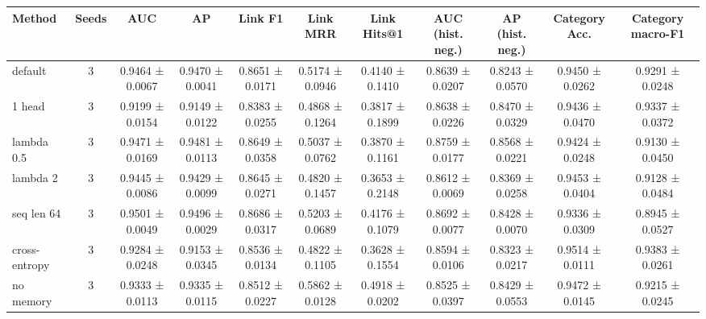 \begin{tabular}{lcccccccccc}
\toprule
Method & Seeds & AUC & AP & Link F1 & Link MRR & Link Hits@1 & AUC (hist. neg.) & AP (hist. neg.) & Category Acc. & Category macro-F1 \\
\midrule
default & 3 & 0.9464 ± 0.0067 & 0.9470 ± 0.0041 & 0.8651 ± 0.0171 & 0.5174 ± 0.0946 & 0.4140 ± 0.1410 & 0.8639 ± 0.0207 & 0.8243 ± 0.0570 & 0.9450 ± 0.0262 & 0.9291 ± 0.0248 \\
1 head & 3 & 0.9199 ± 0.0154 & 0.9149 ± 0.0122 & 0.8383 ± 0.0255 & 0.4868 ± 0.1264 & 0.3817 ± 0.1899 & 0.8638 ± 0.0226 & 0.8470 ± 0.0329 & 0.9436 ± 0.0470 & 0.9337 ± 0.0372 \\
lambda 0.5 & 3 & 0.9471 ± 0.0169 & 0.9481 ± 0.0113 & 0.8649 ± 0.0358 & 0.5037 ± 0.0762 & 0.3870 ± 0.1161 & 0.8759 ± 0.0177 & 0.8568 ± 0.0221 & 0.9424 ± 0.0248 & 0.9130 ± 0.0450 \\
lambda 2 & 3 & 0.9445 ± 0.0086 & 0.9429 ± 0.0099 & 0.8645 ± 0.0271 & 0.4820 ± 0.1457 & 0.3653 ± 0.2148 & 0.8612 ± 0.0069 & 0.8369 ± 0.0258 & 0.9453 ± 0.0404 & 0.9128 ± 0.0484 \\
seq len 64 & 3 & 0.9501 ± 0.0049 & 0.9496 ± 0.0029 & 0.8686 ± 0.0317 & 0.5203 ± 0.0689 & 0.4176 ± 0.1079 & 0.8692 ± 0.0077 & 0.8428 ± 0.0070 & 0.9336 ± 0.0309 & 0.8945 ± 0.0527 \\
cross-entropy & 3 & 0.9284 ± 0.0248 & 0.9153 ± 0.0345 & 0.8536 ± 0.0134 & 0.4822 ± 0.1105 & 0.3628 ± 0.1554 & 0.8594 ± 0.0106 & 0.8323 ± 0.0217 & 0.9514 ± 0.0111 & 0.9383 ± 0.0261 \\
no memory & 3 & 0.9333 ± 0.0113 & 0.9335 ± 0.0115 & 0.8512 ± 0.0227 & 0.5862 ± 0.0128 & 0.4918 ± 0.0202 & 0.8525 ± 0.0397 & 0.8429 ± 0.0553 & 0.9472 ± 0.0145 & 0.9215 ± 0.0245 \\
\bottomrule
\end{tabular}
